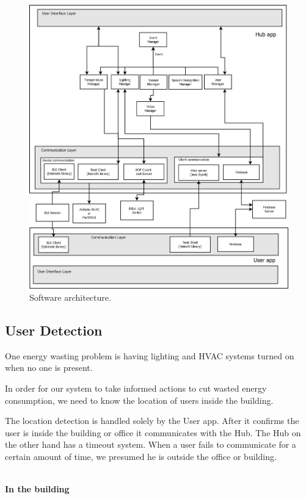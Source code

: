\begin{figure}[H]
\centering
\includegraphics[width=1\textwidth]{Figures/software_dia}
\caption{Software architecture.}
\label{imp:software}
\end{figure}

\subsection{User Detection}\label{user_detection_imp}

One energy wasting problem is having lighting and \ac{HVAC} systems turned on when no one is present.


In order for our system to take informed actions to cut wasted energy consumption, we need to know the location of users inside the building.


The location detection is handled solely by the User app. After it confirms the user is inside the building or office it communicates with the Hub. The Hub on the other hand has a timeout system. When a user fails to communicate for a certain amount of time, we presumed he is outside the office or building.

\mbox{}\\
\textbf{In the building}

